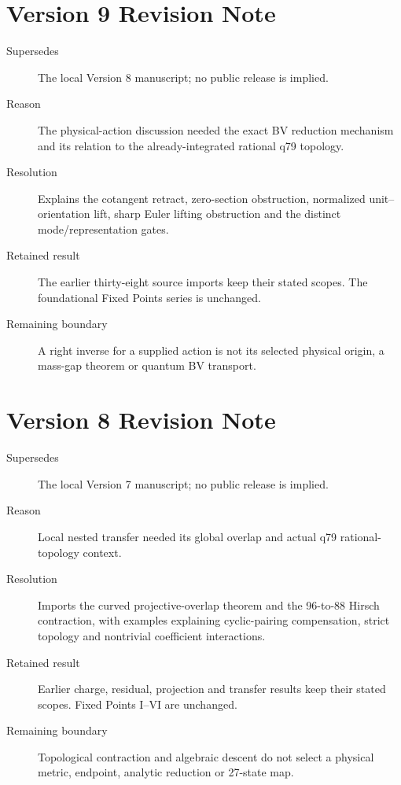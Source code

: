 \documentclass[11pt,a4paper]{article}
\begin{document}
\section*{Version 9 Revision Note}
\begin{description}
\item[Supersedes] The local Version 8 manuscript; no public release is implied.
\item[Reason] The physical-action discussion needed the exact BV reduction
mechanism and its relation to the already-integrated rational q79 topology.
\item[Resolution] Explains the cotangent retract, zero-section obstruction,
normalized unit--orientation lift, sharp Euler lifting obstruction and the
distinct mode/representation gates.
\item[Retained result] The earlier thirty-eight source imports keep their
stated scopes. The foundational Fixed Points series is unchanged.
\item[Remaining boundary] A right inverse for a supplied action is not its
selected physical origin, a mass-gap theorem or quantum BV transport.
\end{description}

\section*{Version 8 Revision Note}
\begin{description}
\item[Supersedes] The local Version 7 manuscript; no public release is implied.
\item[Reason] Local nested transfer needed its global overlap and actual q79
rational-topology context.
\item[Resolution] Imports the curved projective-overlap theorem and the
96-to-88 Hirsch contraction, with examples explaining cyclic-pairing
compensation, strict topology and nontrivial coefficient interactions.
\item[Retained result] Earlier charge, residual, projection and transfer
results keep their stated scopes. Fixed Points I--VI are unchanged.
\item[Remaining boundary] Topological contraction and algebraic descent do
not select a physical metric, endpoint, analytic reduction or 27-state map.
\end{description}
\end{document}
